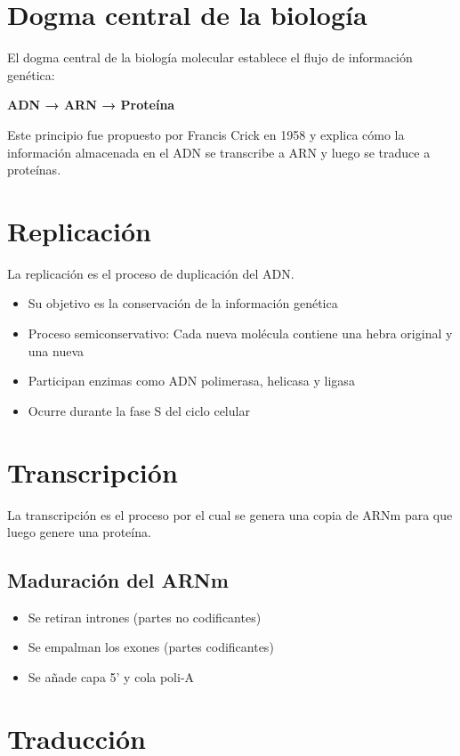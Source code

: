 \section{Dogma central de la biología}

El dogma central de la biología molecular establece el flujo de información genética:

\textbf{ADN → ARN → Proteína}

Este principio fue propuesto por Francis Crick en 1958 y explica cómo la información almacenada en el ADN se transcribe a ARN y luego se traduce a proteínas.

\section{Replicación}

La replicación es el proceso de duplicación del ADN.
\begin{itemize}
    \item Su objetivo es la conservación de la información genética
    \item Proceso semiconservativo: Cada nueva molécula contiene una hebra original y una nueva
    \item Participan enzimas como ADN polimerasa, helicasa y ligasa
    \item Ocurre durante la fase S del ciclo celular
\end{itemize}

\section{Transcripción}

La transcripción es el proceso por el cual se genera una copia de ARNm para que luego genere una proteína.

\subsection{Maduración del ARNm}
\begin{itemize}
    \item Se retiran intrones (partes no codificantes)
    \item Se empalman los exones (partes codificantes)
    \item Se añade capa 5' y cola poli-A
\end{itemize}

\section{Traducción}

